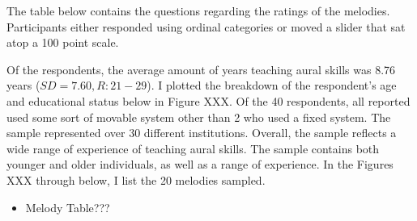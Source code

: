 \documentclass[english,man,floatsintext]{apa6}
\providecommand{\tightlist}{%
  \setlength{\itemsep}{0pt}\setlength{\parskip}{0pt}}
\begin{document}
The table below contains the questions regarding the ratings of the melodies.
Participants either responded using ordinal categories or moved a slider that sat atop a 100 point scale.

\begin{table}

\caption{\label{tab:surveyQuestions2}Item Questions}
\centering
{}
\end{table}

Of the respondents, the average amount of years teaching aural skills was 8.76 years (\(SD = 7.60, R: 21-29\)).
I plotted the breakdown of the respondent's age and educational status below in Figure XXX.
Of the 40 respondents, all reported used some sort of movable system other than 2 who used a fixed system.
The sample represented over 30 different institutions.
Overall, the sample reflects a wide range of experience of teaching aural skills.
The sample contains both younger and older individuals, as well as a range of experience.
In the Figures XXX through below, I list the 20 melodies sampled.

\begin{itemize}
\tightlist
\item
  Melody Table???
\end{itemize}
\end{document}
